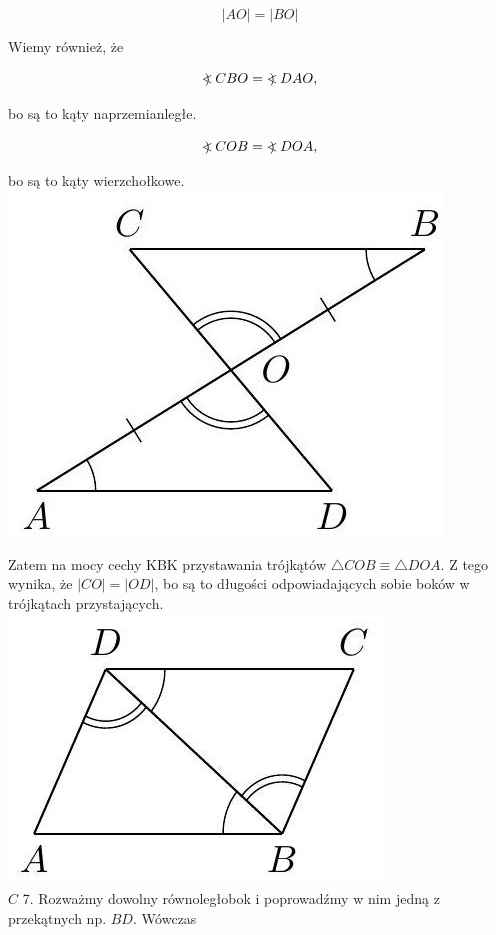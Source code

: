 \documentclass[10pt]{article}
\newcommand\Varangle{\mathop{{<\!\!\!\!\!\text{\small)}}\:}\nolimits}
\begin{document}
\[
|A O|=|B O|
\]

Wiemy również, że

\[
\Varangle C B O=\Varangle D A O,
\]

bo są to kąty naprzemianległe.

\[
\Varangle C O B=\Varangle D O A,
\]

bo są to kąty wierzchołkowe.\\
\includegraphics[max width=\textwidth, center]{2024_11_21_71f62bd117d375398909g-059(3)}

Zatem na mocy cechy KBK przystawania trójkątów \(\triangle C O B \equiv \triangle D O A\). Z tego wynika, że \(|C O|=|O D|\), bo są to długości odpowiadających sobie boków w trójkątach przystających.\\
\includegraphics[max width=\textwidth, center]{2024_11_21_71f62bd117d375398909g-059(1)}\\
\(C\) 7. Rozważmy dowolny równoległobok i poprowadźmy w nim jedną z przekątnych np. \(B D\). Wówczas
\end{document}

